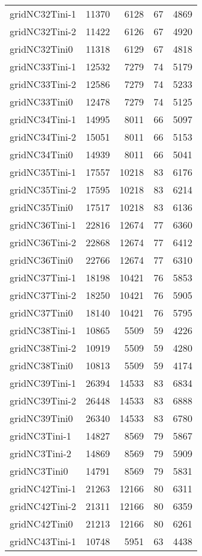 \documentclass[../../../thesis.tex]{subfiles}
\begin{document}
\begin{longtable}{lrrrr}
gridNC32Tini-1 & 11370 & 6128 & 67 & 4869 \\
gridNC32Tini-2 & 11422 & 6126 & 67 & 4920 \\
gridNC32Tini0 & 11318 & 6129 & 67 & 4818 \\
gridNC33Tini-1 & 12532 & 7279 & 74 & 5179 \\
gridNC33Tini-2 & 12586 & 7279 & 74 & 5233 \\
gridNC33Tini0 & 12478 & 7279 & 74 & 5125 \\
gridNC34Tini-1 & 14995 & 8011 & 66 & 5097 \\
gridNC34Tini-2 & 15051 & 8011 & 66 & 5153 \\
gridNC34Tini0 & 14939 & 8011 & 66 & 5041 \\
gridNC35Tini-1 & 17557 & 10218 & 83 & 6176 \\
gridNC35Tini-2 & 17595 & 10218 & 83 & 6214 \\
gridNC35Tini0 & 17517 & 10218 & 83 & 6136 \\
gridNC36Tini-1 & 22816 & 12674 & 77 & 6360 \\
gridNC36Tini-2 & 22868 & 12674 & 77 & 6412 \\
gridNC36Tini0 & 22766 & 12674 & 77 & 6310 \\
gridNC37Tini-1 & 18198 & 10421 & 76 & 5853 \\
gridNC37Tini-2 & 18250 & 10421 & 76 & 5905 \\
gridNC37Tini0 & 18140 & 10421 & 76 & 5795 \\
gridNC38Tini-1 & 10865 & 5509 & 59 & 4226 \\
gridNC38Tini-2 & 10919 & 5509 & 59 & 4280 \\
gridNC38Tini0 & 10813 & 5509 & 59 & 4174 \\
gridNC39Tini-1 & 26394 & 14533 & 83 & 6834 \\
gridNC39Tini-2 & 26448 & 14533 & 83 & 6888 \\
gridNC39Tini0 & 26340 & 14533 & 83 & 6780 \\
gridNC3Tini-1 & 14827 & 8569 & 79 & 5867 \\
gridNC3Tini-2 & 14869 & 8569 & 79 & 5909 \\
gridNC3Tini0 & 14791 & 8569 & 79 & 5831 \\
gridNC42Tini-1 & 21263 & 12166 & 80 & 6311 \\
gridNC42Tini-2 & 21311 & 12166 & 80 & 6359 \\
gridNC42Tini0 & 21213 & 12166 & 80 & 6261 \\
gridNC43Tini-1 & 10748 & 5951 & 63 & 4438 \\

\end{longtable}
\end{document}
